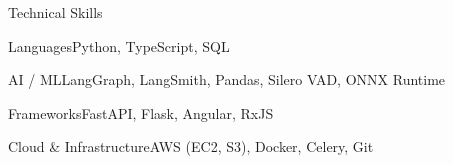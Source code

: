 \documentclass[
	11pt
]{../../../template}
\begin{document}
	\begin{rSection}{T}{echnical Skills}
		\begin{rSet}{Languages}{Python, TypeScript, SQL}
		\end{rSet}
		\begin{rSet}{AI / ML}{LangGraph, LangSmith, Pandas, Silero VAD, ONNX Runtime}
		\end{rSet}
		\begin{rSet}{Frameworks}{FastAPI, Flask, Angular, RxJS}
		\end{rSet}
		\begin{rSet}{Cloud \& Infrastructure}{AWS (EC2, S3), Docker, Celery, Git}
		\end{rSet}
	\end{rSection}
\end{document}
